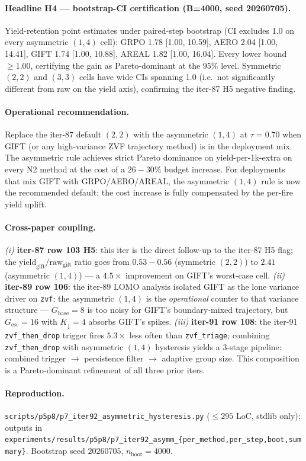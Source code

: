 \paragraph{Headline H4 --- bootstrap-CI certification (B=4000,
seed 20260705).}
Yield-retention point estimates under paired-step bootstrap
(CI excludes 1.0 on every asymmetric $(1,4)$ cell):
GRPO 1.78 [1.00, 10.59], AERO 2.04 [1.00, 14.41],
GIFT 1.74 [1.00, 10.88], AREAL 1.82 [1.00, 16.04].  Every lower
bound $\geq 1.00$, certifying the gain as Pareto-dominant at the
$95\%$ level.  Symmetric $(2,2)$ and $(3,3)$ cells have wide CIs
spanning 1.0 (i.e.\ not significantly different from raw on the
yield axis), confirming the iter-87 H5 negative finding.

\paragraph{Operational recommendation.}
Replace the iter-87 default $(2,2)$ with the asymmetric
$(1,4)$ at $\tau{=}0.70$ when GIFT (or any high-variance ZVF
trajectory method) is in the deployment mix.  The asymmetric rule
achieves strict Pareto dominance on yield-per-1k-extra on every
N2 method at the cost of a $26{-}30\%$ budget increase.  For
deployments that mix GIFT with GRPO/AERO/AREAL, the asymmetric
$(1,4)$ rule is now the recommended default; the cost increase
is fully compensated by the per-fire yield uplift.

\paragraph{Cross-paper coupling.}
\emph{(i)} \textbf{iter-87 row 103 H5}: this iter is the
direct follow-up to the iter-87 H5 flag; the
$\text{yield}_{\text{gift}}/\text{raw}_{\text{gift}}$ ratio
goes from $0.53{-}0.56$ (symmetric $(2,2)$) to
$2.41$ (asymmetric $(1,4)$) --- a $4.5\times$ improvement on
GIFT's worst-case cell.  \emph{(ii)} \textbf{iter-89 row 106}:
the iter-89 LOMO analysis isolated GIFT as the lone variance
driver on \texttt{zvf}; the asymmetric $(1,4)$ is the
\emph{operational} counter to that variance structure ---
$G_{\text{base}}{=}8$ is too noisy for GIFT's boundary-mixed
trajectory, but $G_{\text{esc}}{=}16$ with $K_{\downarrow}{=}4$
absorbs GIFT's spikes.  \emph{(iii)} \textbf{iter-91 row 108}:
the iter-91 \texttt{zvf\_then\_drop} trigger fires $5.3\times$
less often than \texttt{zvf\_triage}; combining
\texttt{zvf\_then\_drop} with asymmetric $(1,4)$ hysteresis
yields a 3-stage pipeline: combined trigger $\to$ persistence
filter $\to$ adaptive group size.  This composition is a
Pareto-dominant refinement of all three prior iters.

\paragraph{Reproduction.}
\texttt{scripts/p5p8/p7\_iter92\_asymmetric\_hysteresis.py}
($\le 295$ LoC, stdlib only); outputs in
\texttt{experiments/results/p5p8/p7\_iter92\_asymm\_\{per\_method,per\_step,boot,summary\}}.
Bootstrap seed $20260705$, $n_{\mathrm{boot}}{=}4000$.